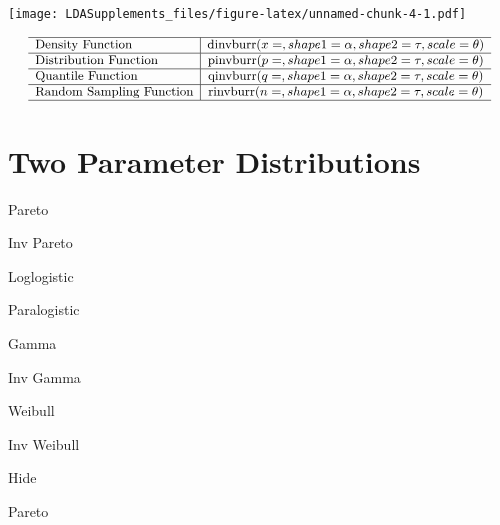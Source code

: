 \documentclass[]{book}
\begin{document}
\texttt{[image: LDASupplements\_files/figure-latex/unnamed-chunk-4-1.pdf]}

\[
{\small
\begin{matrix}
\begin{array}{l|c}
\hline
  \text{Density Function} & \text{dinvburr}(x=, shape1=\alpha, shape2=\tau, scale=\theta) \\
\hline
  \text{Distribution Function} & \text{pinvburr}(p=, shape1=\alpha, shape2=\tau, scale=\theta) \\
\hline
  \text{Quantile Function} & \text{qinvburr}(q=, shape1=\alpha, shape2=\tau, scale=\theta) \\ 
\hline
  \text{Random Sampling Function} & \text{rinvburr}(n=, shape1=\alpha, shape2=\tau, scale=\theta) \\
\hline
\end{array}
\end{matrix}
}
\]

\section{Two Parameter Distributions}\label{two-parameter-distributions}

Pareto

Inv Pareto

Loglogistic

Paralogistic

Gamma

Inv Gamma

Weibull

Inv Weibull

\hypertarget{2pA}{}
{Hide}

Pareto
\end{document}
